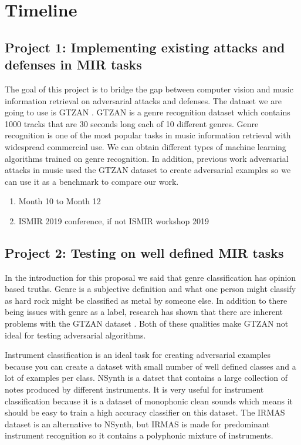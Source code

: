 \documentclass[journal,onecolumn]{IEEEtran}
\begin{document}
\section{Timeline}

\subsection{Project 1: Implementing existing attacks and defenses in MIR tasks}
The goal of this project is to bridge the gap between computer vision and music information retrieval on adversarial attacks and defenses. The dataset we are going to use is GTZAN  . GTZAN is a genre recognition dataset which contains 1000 tracks that are 30 seconds long each of 10 different genres. Genre recognition is one of the most popular tasks in music information retrieval with widespread commercial use. We can obtain different types of machine learning algorithms trained on genre recognition. In addition, previous work adversarial attacks in music used the GTZAN dataset to create adversarial examples \cite{kereliuk_deep_2015} so we can use it as a benchmark to compare our work. 

\begin{enumerate}
\item Month 10 to Month 12
\item ISMIR 2019 conference, if not ISMIR workshop 2019
\end{enumerate}
\subsection{Project 2: Testing on well defined MIR tasks}
In the introduction for this proposal we said that genre classification has opinion based truths. Genre is a subjective definition and what one person might classify as hard rock might be classified as metal by someone else. In addition to there being issues with genre as a label, research has shown that there are inherent problems with the GTZAN dataset \cite{}. Both of these qualities make GTZAN not ideal for testing adversarial algorithms. 

Instrument classification is an ideal task for creating adversarial examples because you can create a dataset with small number of well defined classes and a lot of examples per class.  NSynth \cite{engel_neural_2017} is a datset that contains a large collection of notes produced by different instruments. It is very useful for instrument classification because it is a dataset of monophonic clean sounds which means it should be easy to train a high accuracy classifier on this dataset. The IRMAS \cite{bosch_comparison_2012} dataset is an alternative to NSynth, but IRMAS is made for predominant instrument recognition so it contains a polyphonic mixture of instruments.
\end{document}
